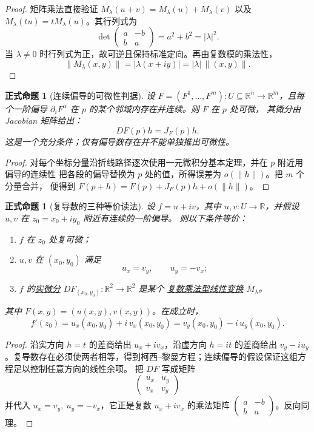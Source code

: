 \documentclass[UTF8,fontset=none,a4paper,11pt]{ctexart}
\theoremstyle{foundation-definition}
\theoremstyle{foundation-theorem}
\theoremstyle{foundation-proposition}
\newtheorem{proposition}[definition]{正式命题}
\theoremstyle{foundation-example}
\theoremstyle{foundation-remark}
\theoremstyle{foundation-theorem}
\newcommand{\term}[2]{\hyperref[#1]{#2}}
\begin{document}
\begin{proof}
矩阵乘法直接验证 \(M_\lambda(u+v)=M_\lambda(u)+M_\lambda(v)\) 以及
\(M_\lambda(tu)=tM_\lambda(u)\)。其行列式为
\[
\det\begin{pmatrix}a&-b\\ b&a\end{pmatrix}=a^2+b^2=|\lambda|^2.
\]
当 \(\lambda\ne0\) 时行列式为正，故可逆且保持标准定向。再由复数模的乘法性，
\[
\|M_\lambda(x,y)\|=|\lambda(x+iy)|=|\lambda|\,\|(x,y)\|.
\]
\end{proof}

\begin{proposition}[连续偏导的可微性判据]\label{prop:continuous-partials-differentiable}
设 \(F=(F^1,\ldots,F^m):U\subseteq\mathbb R^n\to\mathbb R^m\)，且每个一阶偏导
\(\partial_iF^\alpha\) 在 \(p\) 的某个邻域内存在并连续。则 \(F\) 在 \(p\) 处可微，
其微分由 Jacobian 矩阵给出：
\[
DF(p)h=J_F(p)h.
\]
这是一个充分条件；仅有偏导数存在并不能单独推出可微性。
\end{proposition}

\begin{proof}
对每个坐标分量沿折线路径逐次使用一元微积分基本定理，并在 \(p\) 附近用偏导的连续性
把各段的偏导替换为 \(p\) 处的值，所得误差为 \(o(\lVert h\rVert)\)。把 \(m\) 个分量合并，
便得到 \(F(p+h)=F(p)+J_F(p)h+o(\lVert h\rVert)\)。
\end{proof}

\begin{proposition}[复导数的三种等价读法]\label{prop:complex-differential-cr}
设 \(f=u+iv\)，其中 \(u,v:U\to\mathbb R\)，并假设 \(u,v\) 在 \(z_0=x_0+iy_0\) 附近有连续的一阶偏导。
则以下条件等价：
\begin{enumerate}[label=(\alph*)]
  \item \(f\) 在 \(z_0\) 处复可微；
  \item \(u,v\) 在 \((x_0,y_0)\) 满足
  \[
  u_x=v_y,\qquad u_y=-v_x;
  \]
  \item \(f\) 的\term{def:total-differential}{实微分}
  \(DF_{(x_0,y_0)}:\mathbb R^2\to\mathbb R^2\) 是某个
  \term{def:complex-multiplication-linear-map}{复数乘法型线性变换}
  \(M_\lambda\)。
\end{enumerate}
其中 \(F(x,y)=(u(x,y),v(x,y))\)。在成立时，
\[
f'(z_0)=u_x(x_0,y_0)+i\,v_x(x_0,y_0)
       =v_y(x_0,y_0)-i\,u_y(x_0,y_0).
\]
\end{proposition}

\begin{proof}
沿实方向 \(h=t\) 的差商给出 \(u_x+i v_x\)，沿虚方向 \(h=it\) 的差商给出
\(v_y-i u_y\)。复导数存在必须使两者相等，得到柯西--黎曼方程；连续偏导的假设保证这组方程足以控制任意方向的线性余项。
把 \(DF\) 写成矩阵
\[
\begin{pmatrix}u_x&u_y\\v_x&v_y\end{pmatrix}
\]
并代入 \(u_x=v_y,\ u_y=-v_x\)，它正是复数 \(u_x+i v_x\) 的乘法矩阵
\(\begin{pmatrix}a&-b\\b&a\end{pmatrix}\)。反向同理。
\end{proof}
\end{document}
